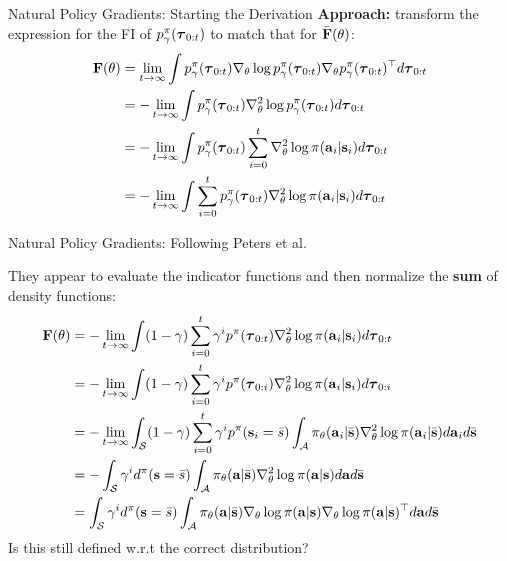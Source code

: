 \documentclass[]{beamer}
\begin{document}
\begin{frame}{Natural Policy Gradients: Starting the Derivation}
    \textbf{Approach:} transform the expression for the FI of $p_\gamma^\pi(\vtau_{0:t})$ to match that for $\bar \vF(\theta)$:
    \begin{align*}
        \vF(\theta) &= \lim_{t \rightarrow \infty} \int p_\gamma^\pi(\vtau_{0:t}) \nabla_\theta \log p_\gamma^\pi(\vtau_{0:t}) \nabla_\theta p_\gamma^\pi(\vtau_{0:t})^\top d \vtau_{0:t}\\
        &= - \lim_{t \rightarrow \infty} \int p_\gamma^\pi(\vtau_{0:t}) \nabla^2_\theta \log p_\gamma^\pi(\vtau_{0:t}) d \vtau_{0:t}\\
        &= - \lim_{t \rightarrow \infty} \int p_\gamma^\pi(\vtau_{0:t}) \sum_{i=0}^t \nabla^2_\theta \log \pi(\va_i | \vs_i) d \vtau_{0:t}\\
        &= - \lim_{t \rightarrow \infty} \int \sum_{i=0}^t p_\gamma^\pi(\vtau_{0:t}) \nabla^2_\theta \log \pi(\va_i | \vs_i) d \vtau_{0:t}
    \end{align*}
\end{frame}

\begin{frame}{Natural Policy Gradients: Following Peters et al.}

    They appear to evaluate the indicator functions and then normalize the \textbf{sum} of density functions:
    {\small
    \begin{align*}
        \vF(\theta) &= - \lim_{t \rightarrow \infty} \int (1-\gamma) \sum_{i=0}^t \gamma^i p^\pi(\vtau_{0:t}) \nabla^2_\theta \log \pi(\va_i | \vs_i) d \vtau_{0:t}\\
        &= - \lim_{t \rightarrow \infty} \int (1-\gamma) \sum_{i=0}^t \gamma^i p^\pi(\vtau_{0:i}) \nabla^2_\theta \log \pi(\va_i | \vs_i) d \vtau_{0:i}\\
        &= - \lim_{t \rightarrow \infty} \int_\cS (1-\gamma) \sum_{i=0}^t \gamma^i p^\pi(\vs_i = \bar s) \int_\cA \pi_\theta(\va_i | \bar \vs) \nabla^2_\theta \log \pi(\va_i | \bar \vs) d \va_i d \bar \vs\\
        &= - \int_\cS \gamma^i d^\pi(\vs = \bar s) \int_\cA \pi_\theta(\va | \bar \vs) \nabla^2_\theta \log \pi(\va | \vs) d \va d \bar \vs\\
        &= \int_\cS \gamma^i d^\pi(\vs = \bar s) \int_\cA \pi_\theta(\va | \bar \vs) \nabla_\theta \log \pi(\va | \vs) \nabla_\theta \log \pi(\va | \vs)^\top d \va d \bar \vs
    \end{align*} }
    Is this still defined w.r.t the correct distribution?
\end{frame}
\end{document}

